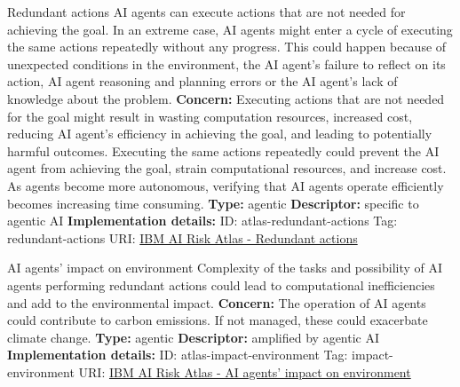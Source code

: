 \begin{definitionbox}{Redundant actions}
AI agents can execute actions that are not needed for achieving the goal. In an extreme case, AI agents might enter a cycle of executing the same actions repeatedly without any progress. This could happen because of unexpected conditions in the environment, the AI agent's failure to reflect on its action, AI agent reasoning and planning errors or the AI agent's lack of knowledge about the problem.\newline\newline
\textbf{Concern: }Executing actions that are not needed for the goal might result in wasting computation resources, increased cost, reducing AI agent's efficiency in achieving the goal, and leading to potentially harmful outcomes. Executing the same actions repeatedly could prevent the AI agent from achieving the goal, strain computational resources, and increase cost. As agents become more autonomous, verifying that AI agents operate efficiently becomes increasing time consuming.\newline\newline
\textbf{Type: }agentic\newline
\textbf{Descriptor: }specific to agentic AI \newline\newline
\textbf{Implementation details: } \newline
ID: atlas-redundant-actions \newline
Tag: redundant-actions \newline
URI:  \href{https://www.ibm.com/docs/en/watsonx/saas?topic=SSYOK8/wsj/ai-risk-atlas/redundant-actions.html}{IBM AI Risk Atlas - Redundant actions}\newline
\end{definitionbox}
\begin{definitionbox}{AI agents' impact on environment}
Complexity of the tasks and possibility of AI agents performing redundant actions could lead to computational inefficiencies and add to the environmental impact.\newline\newline
\textbf{Concern: }The operation of AI agents could contribute to carbon emissions. If not managed, these could exacerbate climate change.\newline\newline
\textbf{Type: }agentic\newline
\textbf{Descriptor: }amplified by agentic AI \newline\newline
\textbf{Implementation details: } \newline
ID: atlas-impact-environment \newline
Tag: impact-environment \newline
URI:  \href{https://www.ibm.com/docs/en/watsonx/saas?topic=SSYOK8/wsj/ai-risk-atlas/impact-environment.html}{IBM AI Risk Atlas - AI agents' impact on environment}\newline
\end{definitionbox}

